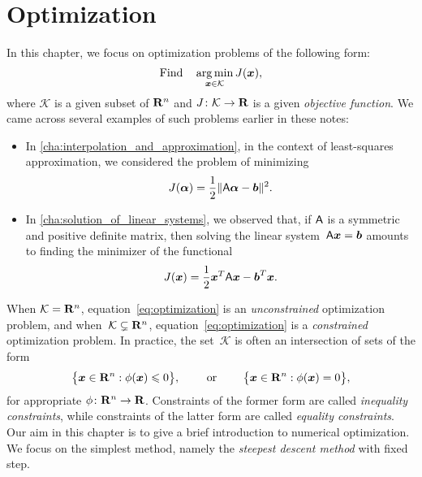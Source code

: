 \chapter{Optimization}%
\label{cha:Optimization}

\minitoc

In this chapter, we focus on optimization problems of the following form:
\begin{equation}
    \label{eq:optimization}
    \text{Find} \quad \operatorname*{arg\,min}_{\mathbf{\boldsymbol{x}} \in \mathcal K} J(\mathbf{\boldsymbol{x}}),
\end{equation}
where $\mathcal K$ is a given subset of $\mathbf R^n$ and $J\colon \mathcal K \to \mathbf R$ is a given \emph{objective function}.
We came across several examples of such problems earlier in these notes:
\begin{itemize}
    \item
        In \cref{cha:interpolation_and_approximation},
        in the context of least-squares approximation,
        we considered the problem of minimizing
        \[
            J(\mathbf{\boldsymbol{\alpha}}) = \frac{1}{2} \lVert \mathsf A \mathbf{\boldsymbol{\alpha}} - \mathbf{\boldsymbol{b}} \rVert^2.
        \]

    \item
        In \cref{cha:solution_of_linear_systems},
        we observed that,
        if $\mathsf A$ is a symmetric and positive definite matrix,
        then solving the linear system~$\mathsf A \mathbf{\boldsymbol{x}} = \mathbf{\boldsymbol{b}}$
        amounts to finding the minimizer of the functional
        \[
            J(\mathbf{\boldsymbol{x}})  = \frac{1}{2} \mathbf{\boldsymbol{x}}^T \mathsf A \mathbf{\boldsymbol{x}} - \mathbf{\boldsymbol{b}}^T \mathbf{\boldsymbol{x}}.
        \]
\end{itemize}
When $\mathcal K = \mathbf R^n$,
equation~\eqref{eq:optimization} is an \emph{unconstrained} optimization problem,
and when~$\mathcal K \subsetneq \mathbf R^n$,
equation~\eqref{eq:optimization} is a \emph{constrained} optimization problem.
In practice,
the set~$\mathcal K$ is often an intersection of sets of the form
\[
    \bigl\{ \mathbf{\boldsymbol{x}} \in \mathbf R^n : \phi(\mathbf{\boldsymbol{x}}) \leqslant 0 \bigr\},
    \qquad
    \text{ or }
    \qquad
    \bigl\{ \mathbf{\boldsymbol{x}} \in \mathbf R^n : \phi(\mathbf{\boldsymbol{x}}) = 0 \bigr\},
\]
for appropriate $\phi\colon \mathbf R^n \to \mathbf R$.
Constraints of the former form are called \emph{inequality constraints},
while constraints of the latter form are called \emph{equality constraints}.
Our aim in this chapter is to give a brief introduction to numerical optimization.
We focus on the simplest method,
namely the \emph{steepest descent method} with fixed step.
